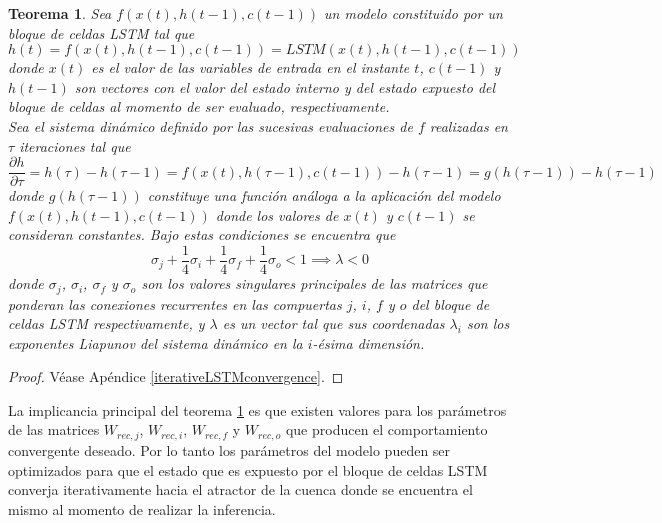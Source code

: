 \documentclass{article}
\newtheorem{theorem}{Teorema}
\begin{document}
	\begin{theorem}
		\label{iterativeLSTMConvergenceTheorem}
		Sea $f(x(t), h(t-1), c(t-1))$ un modelo constituido por un bloque de celdas LSTM tal que
		\begin{equation*}
		h(t) = f(x(t), h(t-1), c(t-1)) =  LSTM(x(t), h(t-1), c(t-1))
		\end{equation*}
		donde $x(t)$ es el valor de las variables de entrada en el instante $t$, $c(t-1)$ y $h(t-1)$ son vectores con el valor del estado interno y del estado expuesto del bloque de celdas al momento de ser evaluado, respectivamente.\\
		Sea el sistema dinámico definido por las sucesivas evaluaciones de $f$ realizadas en $\tau$ iteraciones tal que
		\begin{equation*}
		\dfrac{\partial h}{\partial \tau} = h(\tau) -  h(\tau-1) = f(x(t), h(\tau-1), c(t-1)) - h(\tau-1) = g(h(\tau-1)) - h(\tau-1)
		\end{equation*}
		donde $g(h(\tau-1))$ constituye una función análoga a la aplicación del modelo $f(x(t), h(t-1), c(t-1))$ donde los valores de $x(t)$ y $c(t-1)$ se consideran constantes.
		Bajo estas condiciones se encuentra que
		\begin{equation*}
		\sigma_j + \frac{1}{4} \sigma_i + \frac{1}{4} \sigma_f + \frac{1}{4} \sigma_o < 1 \implies \lambda < 0
		\end{equation*}
		donde $\sigma_j$, $\sigma_i$, $\sigma_f$ y $\sigma_o$ son los valores singulares principales de las matrices que ponderan las conexiones recurrentes en las compuertas $j$, $i$, $f$ y $o$ del bloque de celdas LSTM respectivamente, y $\lambda$ es un vector tal que sus coordenadas $\lambda_i$ son los exponentes Liapunov del sistema dinámico en la $i$-ésima dimensión.
	\end{theorem}
	\begin{proof}
		Véase Apéndice \ref{iterativeLSTMconvergence}.
	\end{proof}
	
	La implicancia principal del teorema \ref{iterativeLSTMConvergenceTheorem} es que existen valores para los parámetros de las matrices $W_{rec,j}$, $W_{rec,i}$, $W_{rec,f}$ y $W_{rec,o}$ que producen el comportamiento convergente deseado. Por lo tanto los parámetros del modelo pueden ser optimizados para que el estado que es expuesto por el bloque de celdas LSTM converja iterativamente hacia el atractor de la cuenca donde se encuentra el mismo al momento de realizar la inferencia.\\
	
\end{document}
